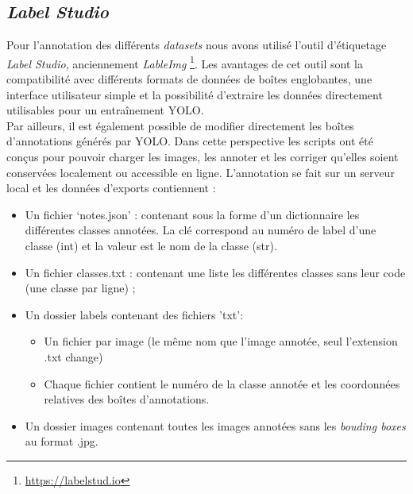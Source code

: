 \documentclass[12pt,twoside]{book}
\begin{document}
\subsection{\textit{Label Studio}}

Pour l’annotation des différents \textit{datasets} nous avons utilisé l’outil d’étiquetage \textit{Label Studio}, anciennement \textit{LableImg} \footnote{\url{https://labelstud.io}}. Les avantages de cet outil sont la compatibilité avec différents formats de données de boîtes englobantes, une interface utilisateur simple et la possibilité d’extraire les données directement utilisables pour un entraînement YOLO.\\

Par ailleurs, il est également possible de modifier directement les boîtes d’annotations générés par YOLO. Dans cette perspective les scripts ont été conçus pour pouvoir charger les images, les annoter et les corriger qu’elles soient conservées localement ou accessible en ligne. L'annotation se fait sur un serveur local et les données d'exports contiennent :
\newpage
\begin{itemize}
    \item Un fichier ‘notes.json’ : contenant sous la forme d'un dictionnaire les différentes classes annotées. La clé correspond au numéro de label d'une classe (int) et la valeur est le nom de la classe (str).
    \item Un fichier classes.txt : contenant une liste les différentes classes sans leur code (une classe par ligne) ;
    \item Un dossier labels contenant des fichiers 'txt':
    \begin{itemize}
        \item Un fichier par image (le même nom que l'image annotée, seul l'extension .txt change)
        \item Chaque fichier contient le numéro de la classe annotée et les coordonnées relatives des boîtes d’annotations. 
    \end{itemize}
    \item Un dossier images contenant toutes les images annotées sans les \textit{bouding boxes} au format .jpg.
\end{itemize}
\end{document}
